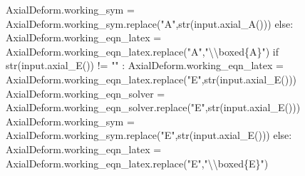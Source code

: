 \documentclass[
  letterpaper,
  DIV=11,
  numbers=noendperiod]{scrreprt}
\newenvironment{Shaded}{\begin{snugshade}}{\end{snugshade}}
\newcommand{\NormalTok}[1]{\textcolor[rgb]{0.00,0.23,0.31}{#1}}
\begin{document}
\begin{Shaded}
\begin{Highlighting}[]
\NormalTok{                AxialDeform.working\_sym = AxialDeform.working\_sym.replace("A",str(input.axial\_A()))}
\NormalTok{            else:}
\NormalTok{                AxialDeform.working\_eqn\_latex = AxialDeform.working\_eqn\_latex.replace("A","\textbackslash{}\textbackslash{}boxed\{A\}")}
\NormalTok{            if str(input.axial\_E()) != "" : }
\NormalTok{                AxialDeform.working\_eqn\_latex = AxialDeform.working\_eqn\_latex.replace("E",str(input.axial\_E()))}
\NormalTok{                AxialDeform.working\_eqn\_solver = AxialDeform.working\_eqn\_solver.replace("E",str(input.axial\_E()))}
\NormalTok{                AxialDeform.working\_sym = AxialDeform.working\_sym.replace("E",str(input.axial\_E()))}
\NormalTok{            else:}
\NormalTok{                AxialDeform.working\_eqn\_latex = AxialDeform.working\_eqn\_latex.replace("E","\textbackslash{}\textbackslash{}boxed\{E\}")}
            

\end{Highlighting}
\end{Shaded}
\end{document}
